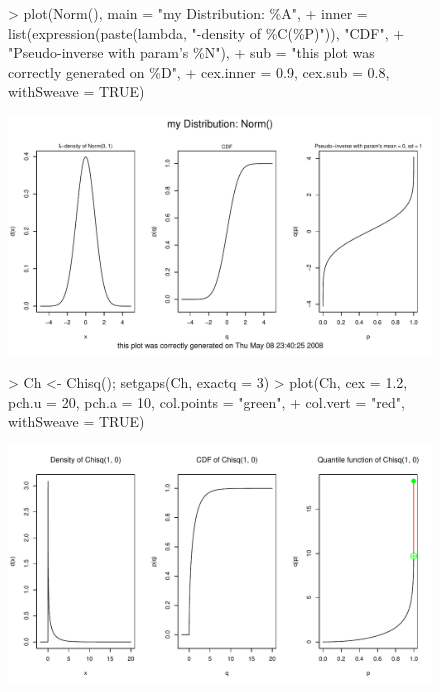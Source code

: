 \documentclass[11pt]{article}
\begin{document}
\begin{figure}[p]
\begin{Schunk}
\begin{Sinput}
> plot(Norm(), main = "my Distribution: \%A",
+      inner = list(expression(paste(lambda, "-density of \%C(\%P)")), "CDF",
+                   "Pseudo-inverse with param's \%N"),
+      sub = "this plot was correctly generated on \%D",
+      cex.inner = 0.9, cex.sub = 0.8, withSweave = TRUE)
\end{Sinput}
\end{Schunk}
\includegraphics{distr-plotex9}
\end{figure}

\begin{figure}[p]
\begin{Schunk}
\begin{Sinput}
> Ch <- Chisq(); setgaps(Ch, exactq = 3)
> plot(Ch, cex = 1.2, pch.u = 20, pch.a = 10, col.points = "green",
+      col.vert = "red", withSweave = TRUE)
\end{Sinput}
\end{Schunk}
\includegraphics{distr-plotex10}
\end{figure}
\end{document}

